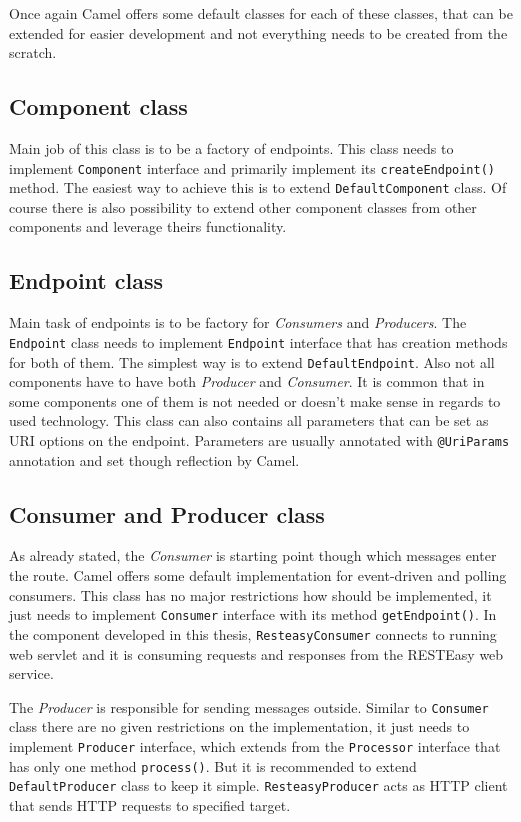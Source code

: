 \documentclass[12pt,final,oneside]{fithesis2}
\begin{document}
Once again Camel offers some default classes for each of these classes, that can be extended for easier development and not everything needs to be created from the scratch.

\subsection*{Component class}
Main job of this class is to be a factory of endpoints. This class needs to implement \texttt{Component} interface and primarily implement its \texttt{createEndpoint()} method. The easiest way to achieve this is to extend \texttt{DefaultComponent} class. Of course there is also possibility to extend other component classes from other components and leverage theirs functionality.

\subsection*{Endpoint class}
Main task of endpoints is to be factory for \textit{Consumers} and \textit{Producers}. The \texttt{Endpoint} class needs to implement \texttt{Endpoint} interface that has creation methods for both of them. The simplest way is to extend \texttt{DefaultEndpoint}. Also not all components have to have both \textit{Producer} and \textit{Consumer}. It is common that in some components one of them is not needed or doesn't make sense in regards to used technology. This class can also contains all parameters that can be set as URI options on the endpoint. Parameters are usually annotated with \texttt{@UriParams} annotation and set though reflection by Camel.

\subsection*{Consumer and Producer class}
As already stated, the \textit{Consumer} is starting point though which messages enter the route. Camel offers some default implementation for event-driven and polling consumers. This class has no major restrictions how should be implemented, it just needs to implement \texttt{Consumer} interface with its method \texttt{getEndpoint()}. In the component developed in this thesis, \texttt{ResteasyConsumer} connects to running web servlet and it is consuming requests and responses from the RESTEasy web service. 

The \textit{Producer} is responsible for sending messages outside. Similar to \texttt{Consumer} class there are no given restrictions on the implementation, it just needs to implement \texttt{Producer} interface, which extends from the \texttt{Processor} interface that has only one method \texttt{process()}. But it is recommended to extend \texttt{DefaultProducer} class to keep it simple\cite{camel-cookbook}. \texttt{ResteasyProducer} acts as HTTP client that sends HTTP requests to specified target.
\end{document}
